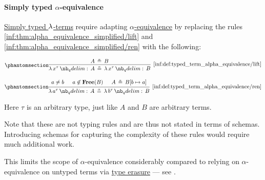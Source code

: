 \paragraph{Simply typed \( \alpha \)-equivalence}

\begin{definition}\label{def:typed_term_alpha_equivalence}
  \hyperref[def:typed_lambda_term]{Simply typed \( \mathrm{\lambda} \)-terms} require adapting \hyperref[def:lambda_term_alpha_equivalence]{\( \alpha \)-equivalence} by replacing the rules \ref{inf:thm:alpha_equivalence_simplified/lift} and \ref{inf:thm:alpha_equivalence_simplified/ren} with the following:
  \begin{paracol}{2}
    \begin{leftcolumn}
      \begin{equation*}\taglabel[\ensuremath{ \logic{Lift}_\alpha^{\T{tt}} }]{inf:def:typed_term_alpha_equivalence/lift}
        \begin{prooftree}
          \hypo{ A \aequiv B }
          \infer1[\ref{inf:def:typed_term_alpha_equivalence/lift}]{ \qabs {x^\tau} A \aequiv \qabs {x^\tau} B }
        \end{prooftree}
      \end{equation*}
    \end{leftcolumn}

    \begin{rightcolumn}
      \begin{equation*}\taglabel[\ensuremath{ \logic{Ren}_\alpha^{\T{tt}} }]{inf:def:typed_term_alpha_equivalence/ren}
        \begin{prooftree}
          \hypo{ a \neq b }
          \hypo{ a \not\in \op*{Free}(B) }
          \hypo{ A \aequiv B[b \mapsto a] }
          \infer3[\ref{inf:def:typed_term_alpha_equivalence/ren}]{ \qabs {a^\tau} A \aequiv \qabs {b^\tau} B }
        \end{prooftree}
      \end{equation*}
    \end{rightcolumn}
  \end{paracol}
\end{definition}
\begin{comments}
  \item Here \( \tau \) is an arbitrary type, just like \( A \) and \( B \) are arbitrary terms.

  \item Note that these are not typing rules and are thus not stated in terms of schemas. Introducing schemas for capturing the complexity of these rules would require much additional work.

  \item This limits the scope of \( \alpha \)-equivalence considerably compared to relying on \( \alpha \)-equivalence on untyped terms via \hyperref[alg:type_erasure]{type erasure} --- see .
\end{comments}

